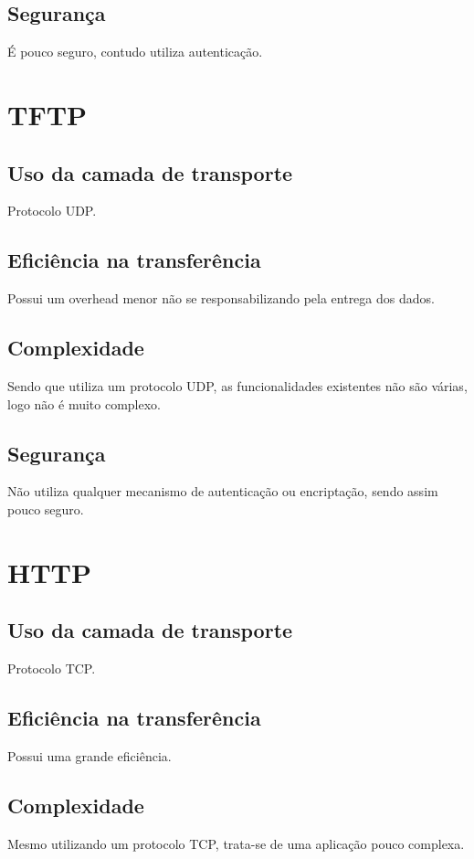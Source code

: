 \documentclass[a4paper]{report}
\begin{document}
\subsection{Segurança}
É pouco seguro, contudo utiliza autenticação.

\section{TFTP}
\subsection{Uso da camada de transporte}
Protocolo UDP.

\subsection{Eficiência na transferência}
Possui um overhead menor não se responsabilizando pela entrega dos dados.

\subsection{Complexidade}
Sendo que utiliza um protocolo UDP, as funcionalidades existentes não são
várias, logo não é muito complexo.

\subsection{Segurança}
Não utiliza qualquer mecanismo de autenticação ou encriptação, sendo assim pouco
seguro.

\section{HTTP}
\subsection{Uso da camada de transporte}
Protocolo TCP.

\subsection{Eficiência na transferência}
Possui uma grande eficiência.

\subsection{Complexidade}
Mesmo utilizando um protocolo TCP, trata-se de uma aplicação pouco complexa.
\end{document}
